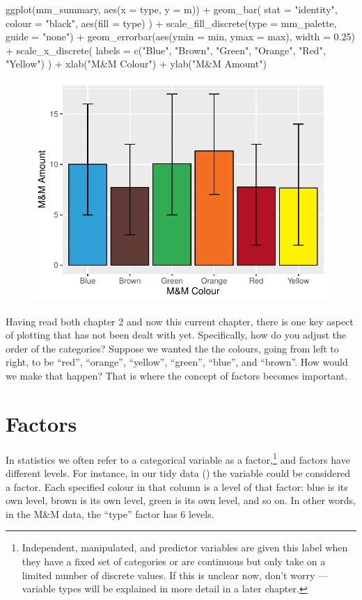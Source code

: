 \begin{inR}
ggplot(mm_summary, aes(x = type, y = m)) +
  geom_bar(
    stat = "identity",
    colour = "black",
    aes(fill = type)
  ) +
  scale_fill_discrete(type = mm_palette, guide = "none") +
  geom_errorbar(aes(ymin = min, ymax = max), width = 0.25) +
  scale_x_discrete(
    labels = c("Blue", "Brown", "Green", "Orange", "Red", "Yellow")
  ) +
  xlab("M&M Colour") +
  ylab("M&M Amount")
\end{inR}

\vspace{2em}

\begin{figure}[H]
\includegraphics[scale = .75]{graphics/ch3Figs/bar_4.pdf}
\end{figure}

Having read both chapter 2 and now this current chapter, there is one key aspect of plotting that has not been dealt with yet. Specifically, how do you adjust the order of the categories? Suppose we wanted the the colours, going from left to right, to be ``red'', ``orange'', ``yellow'', ``green'', ``blue'', and ``brown''. How would we make that happen? That is where the concept of factors becomes important.

\section{Factors}

In statistics we often refer to a categorical variable as a \gls{factor},\footnote{Independent, manipulated, and predictor variables are given this label when they have a fixed set of categories or are continuous but only take on a limited number of discrete values. If this is unclear now, don't worry — variable types will be explained in more detail in a later chapter.} and factors have different \glspl{level}.  For instance, in our tidy data () the variable  could be considered a factor. Each specified colour in that column is a level of that factor: blue is its own  level, brown is its own level, green is its own level, and so on. In other words, in the M\&M data, the ``type'' factor has 6 levels.

